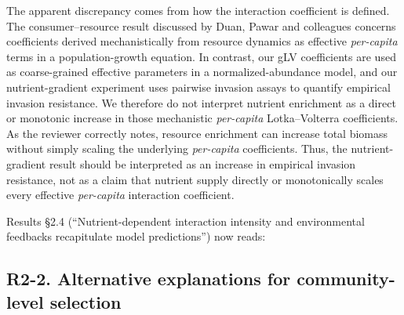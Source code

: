 \responselabel
The apparent discrepancy comes from how the interaction coefficient is defined. The consumer--resource result discussed by Duan, Pawar and colleagues concerns coefficients derived mechanistically from resource dynamics as effective \emph{per-capita} terms in a population-growth equation. In contrast, our gLV coefficients are used as coarse-grained effective parameters in a normalized-abundance model, and our nutrient-gradient experiment uses pairwise invasion assays to quantify empirical invasion resistance. We therefore do not interpret nutrient enrichment as a direct or monotonic increase in those mechanistic \emph{per-capita} Lotka--Volterra coefficients. As the reviewer correctly notes, resource enrichment can increase total biomass without simply scaling the underlying \emph{per-capita} coefficients. Thus, the nutrient-gradient result should be interpreted as an increase in empirical invasion resistance, not as a claim that nutrient supply directly or monotonically scales every effective \emph{per-capita} interaction coefficient.

Results \S2.4 (``Nutrient-dependent interaction intensity and environmental feedbacks recapitulate model predictions'') now reads: 

\subsection*{R2-2. Alternative explanations for community-level selection}

